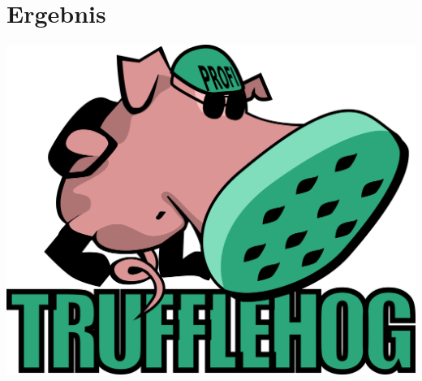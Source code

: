 \documentclass[18pt]{beamer}
\begin{document}
\section{Ergebnis}
    
    

\begin{frame}
	\centering
	\includegraphics[width=0.8\linewidth]{images/title}
\end{frame}

\appendix
\beginbackup


\backupend
\end{document}
